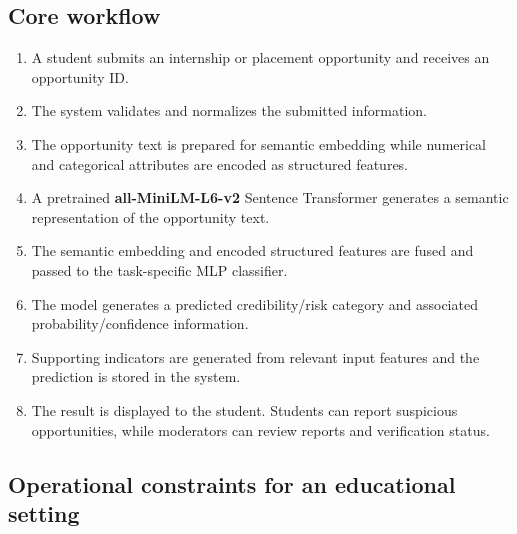 \documentclass[11pt,a4paper]{article}
\begin{document}
\subsection{Core workflow}

\begin{enumerate}[leftmargin=0.7cm]

    \item A student submits an internship or placement opportunity and
    receives an opportunity ID.

    \item The system validates and normalizes the submitted information.

    \item The opportunity text is prepared for semantic embedding while
    numerical and categorical attributes are encoded as structured features.

    \item A pretrained \textbf{all-MiniLM-L6-v2} Sentence Transformer generates
    a semantic representation of the opportunity text.

    \item The semantic embedding and encoded structured features are fused and
    passed to the task-specific MLP classifier.

    \item The model generates a predicted credibility/risk category and
    associated probability/confidence information.

    \item Supporting indicators are generated from relevant input features
    and the prediction is stored in the system.

    \item The result is displayed to the student. Students can report
    suspicious opportunities, while moderators can review reports and
    verification status.
\end{enumerate}

\subsection{Operational constraints for an educational setting}
\end{document}
